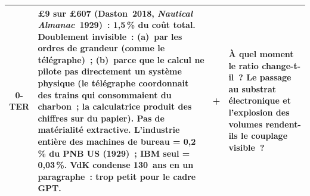 \begin{table}[p]
\begin{tabularx}{\textwidth}{@{}cXcp{4.5cm}@{}}
\midrule

0-TER &
£9 sur £607 (Daston~2018, \emph{Nautical Almanac}~1929)~: 1,5\,\% du coût total. \textbf{Doublement invisible}~: (a)~par les ordres de grandeur (comme le télégraphe)~; (b)~parce que le calcul ne pilote pas directement un système physique (le télégraphe coordonnait des trains qui consommaient du charbon~; la calculatrice produit des chiffres sur du papier). Pas de matérialité extractive. L'industrie entière des machines de bureau = 0,2\,\% du PNB US (1929)~; IBM seul = 0,03\,\%. VdK condense 130~ans en un paragraphe~: trop petit pour le cadre GPT. & + &
À quel moment le ratio change-t-il~? Le passage au substrat électronique et l'explosion des volumes rendent-ils le couplage visible~? \\

\bottomrule
\end{tabularx}
\renewcommand{\arraystretch}{1.0}
\end{table}


%
%
%
